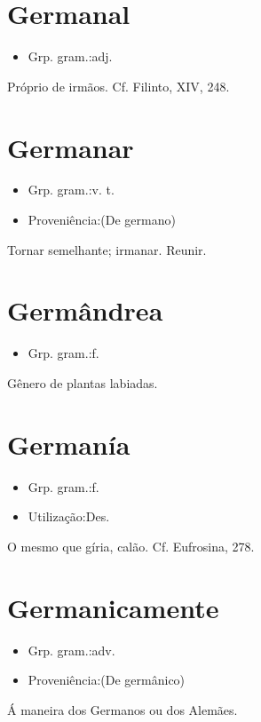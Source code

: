 \section{Germanal}
\begin{itemize}
\item {Grp. gram.:adj.}
\end{itemize}
Próprio de irmãos. Cf. Filinto, XIV, 248.
\section{Germanar}
\begin{itemize}
\item {Grp. gram.:v. t.}
\end{itemize}
\begin{itemize}
\item {Proveniência:(De \textunderscore germano\textunderscore )}
\end{itemize}
Tornar semelhante; irmanar.
Reunir.
\section{Germândrea}
\begin{itemize}
\item {Grp. gram.:f.}
\end{itemize}
Gênero de plantas labiadas.
\section{Germanía}
\begin{itemize}
\item {Grp. gram.:f.}
\end{itemize}
\begin{itemize}
\item {Utilização:Des.}
\end{itemize}
O mesmo que \textunderscore gíria\textunderscore , \textunderscore calão\textunderscore . Cf. \textunderscore Eufrosina\textunderscore , 278.
\section{Germanicamente}
\begin{itemize}
\item {Grp. gram.:adv.}
\end{itemize}
\begin{itemize}
\item {Proveniência:(De \textunderscore germânico\textunderscore )}
\end{itemize}
Á maneira dos Germanos ou dos Alemães.

